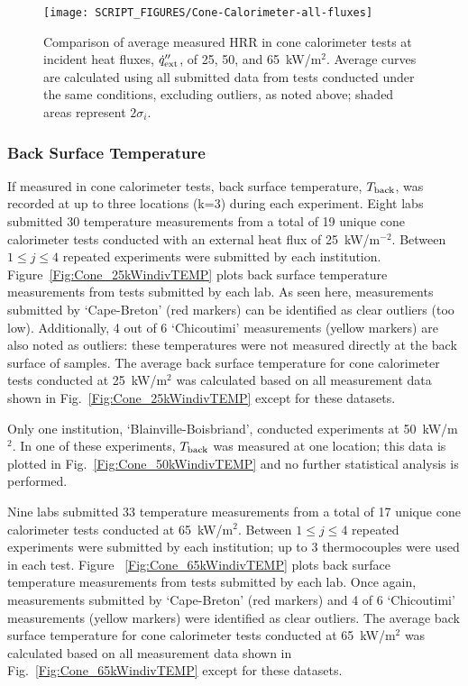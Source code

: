 \documentclass{book}
\begin{document}
\begin{figure}
  \centering
  \texttt{[image: SCRIPT\_FIGURES/Cone-Calorimeter-all-fluxes]}
  \caption{Comparison of average measured HRR in cone calorimeter tests at incident heat fluxes, $\dot{q}_{\rm ext}''$, of 25, 50, and 65~kW/m$^2$. Average curves are calculated using all submitted data from tests conducted under the same conditions, excluding outliers, as noted above; shaded areas represent $2\sigma_i$.}
  \label{Fig:Cone-Calorimeter-all-fluxes}
\end{figure}

\newpage
\subsubsection{Back Surface Temperature}

If measured in cone calorimeter tests, back surface temperature, $T_{\rm back}$, was recorded at up to three locations (k=3) during each experiment. Eight labs submitted 30 temperature measurements from a total of 19 unique cone calorimeter tests conducted with an external heat flux of 25~kW/m$^{-2}$. Between $1\le j\le4$ repeated experiments were submitted by each institution.  Figure~\ref{Fig:Cone_25kWindivTEMP} plots back surface temperature measurements from tests submitted by each lab. As seen here, measurements submitted by ‘Cape-Breton’ (red markers) can be identified as clear outliers (too low). Additionally, 4 out of 6 ‘Chicoutimi’ measurements (yellow markers) are also noted as outliers: these temperatures were not measured directly at the back surface of samples. The average back surface temperature for cone calorimeter tests conducted at 25~kW/m$^2$ was calculated based on all measurement data shown in Fig.~\ref{Fig:Cone_25kWindivTEMP} except for these datasets.

Only one institution, ‘Blainville-Boisbriand’, conducted experiments at 50~kW/m$^2$. In one of these experiments, $T_{\rm back}$ was measured at one location; this data is plotted in Fig.~\ref{Fig:Cone_50kWindivTEMP} and no further statistical analysis is performed.

Nine labs submitted 33 temperature measurements from a total of 17 unique cone calorimeter tests conducted at 65~kW/m$^2$. Between $1\le j\le4$ repeated experiments were submitted by each institution; up to 3 thermocouples were used in each test. Figure ~\ref{Fig:Cone_65kWindivTEMP} plots back surface temperature measurements from tests submitted by each lab. Once again, measurements  submitted by ‘Cape-Breton’ (red markers) and 4 of 6 ‘Chicoutimi’ measurements (yellow markers) were identified as clear outliers. The average back surface temperature for cone calorimeter tests conducted at 65~kW/m$^2$ was calculated based on all measurement data shown in Fig.~\ref{Fig:Cone_65kWindivTEMP} except for these datasets.
\end{document}
